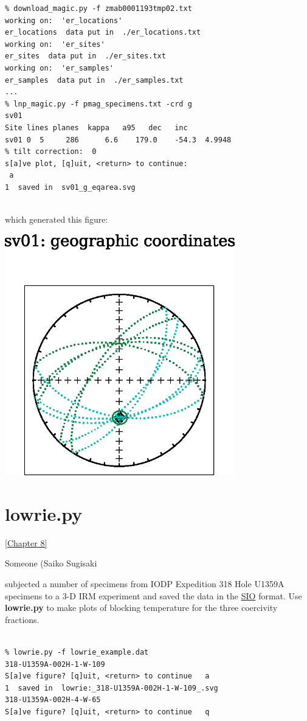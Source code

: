 \documentclass[11pt]{book}
\begin{document}
{{{{\begin{verbatim}
% download_magic.py -f zmab0001193tmp02.txt
working on:  'er_locations'
er_locations  data put in  ./er_locations.txt
working on:  'er_sites'
er_sites  data put in  ./er_sites.txt
working on:  'er_samples'
er_samples  data put in  ./er_samples.txt
...
% lnp_magic.py -f pmag_specimens.txt -crd g
sv01
Site lines planes  kappa   a95   dec   inc
sv01 0  5     286      6.6    179.0    -54.3  4.9948 
% tilt correction:  0
s[a]ve plot, [q]uit, <return> to continue:
 a
1  saved in  sv01_g_eqarea.svg
 
\end{verbatim}

\noindent which generated this figure:

\includegraphics[width=10cm]{EPSfiles/lnp-ex.eps}}

\section{lowrie.py}
\href{http://Webbook2.html#lowrie}{[Chapter 8]}

Someone (Saiko Sugisaki} subjected a number of specimens from IODP Expedition 318 Hole U1359A specimens to a 3-D IRM experiment and saved the data in the \href{#sio_magic.py}{SIO} format.   
Use {\bf lowrie.py} to make plots of blocking temperature for the three  coercivity fractions.  

\begin{verbatim}

% lowrie.py -f lowrie_example.dat
318-U1359A-002H-1-W-109
S[a]ve figure? [q]uit, <return> to continue   a
1  saved in  lowrie:_318-U1359A-002H-1-W-109_.svg
318-U1359A-002H-4-W-65
S[a]ve figure? [q]uit, <return> to continue   q
\end{verbatim}

}}
\end{document}
